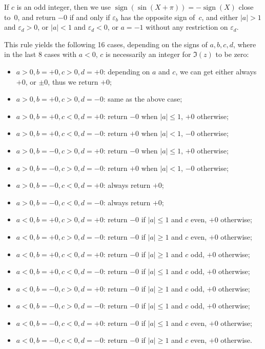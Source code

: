 \documentclass [11pt]{article}
\renewcommand {\epsilon}{\varepsilon}
\newcommand {\sign}{\operatorname{sign}}
\begin{document}
If $c$ is an odd integer, then we use
$\sign (\sin (X + \pi)) = - \sign (X)$ close to~$0$, and
return $-0$  if and only if
$\epsilon_b$ has the opposite sign of~$c$, and
either $|a| > 1$ and $\epsilon_d > 0$,
or     $|a| < 1$ and $\epsilon_d < 0$,
or     $a = -1$ without any restriction on $\epsilon_d$.


This rule yields the following 16 cases, depending on the signs of
$a, b, c, d$, where in the last 8 cases with $a < 0$, $c$ is necessarily an
integer for $\Im(z)$ to be zero:
\begin{itemize}
\item $a > 0, b = +0, c > 0, d = +0$: depending on $a$ and $c$,
  we can get either always $+0$, or $\pm 0$, thus we return $+0$;
\item $a > 0, b = +0, c > 0, d = -0$: same as the above case;
\item $a > 0, b = +0, c < 0, d = +0$: return $-0$ when $|a|\le 1$,
  $+0$ otherwise;
\item $a > 0, b = +0, c < 0, d = -0$: return $+0$ when $|a| < 1$,
  $-0$ otherwise;
\item $a > 0, b = -0, c > 0, d = +0$: return $-0$ when $|a| \le 1$,
  $+0$ otherwise;
\item $a > 0, b = -0, c > 0, d = -0$: return $+0$ when $|a| < 1$,
  $-0$ otherwise;
\item $a > 0, b = -0, c < 0, d = +0$: always return $+0$;
\item $a > 0, b = -0, c < 0, d = -0$: always return $+0$;
\item $a < 0, b = +0, c > 0, d = +0$: return $-0$ if $|a| \le 1$ and
  $c$ even, $+0$ otherwise;
\item $a < 0, b = +0, c > 0, d = -0$: return $-0$ if $|a| \ge 1$ and
  $c$ even, $+0$ otherwise;
\item $a < 0, b = +0, c < 0, d = +0$: return $-0$ if $|a| \ge 1$ and
  $c$ odd, $+0$ otherwise;
\item $a < 0, b = +0, c < 0, d = -0$: return $-0$ if $|a| \le 1$ and
  $c$ odd, $+0$ otherwise;
\item $a < 0, b = -0, c > 0, d = +0$: return $-0$ if $|a| \ge 1$ and
  $c$ odd, $+0$ otherwise;
\item $a < 0, b = -0, c > 0, d = -0$: return $-0$ if $|a| \le 1$ and
  $c$ odd, $+0$ otherwise;
\item $a < 0, b = -0, c < 0, d = +0$: return $-0$ if $|a| \le 1$ and
  $c$ even, $+0$ otherwise;
\item $a < 0, b = -0, c < 0, d = -0$: return $-0$ if $|a| \ge 1$ and
  $c$ even, $+0$ otherwise.
\end{itemize}
\end{document}
